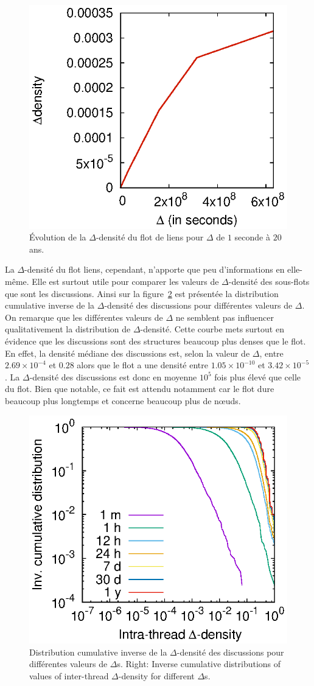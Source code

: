 \begin{figure}
	\centering
	\includegraphics[width=0.48\linewidth]{img/mailing/global_linlin.eps}
	\caption{Évolution de la $\Delta$-densité du flot de liens pour $\Delta$ de $1$ seconde à $20$ ans.}
	\label{fig:dens_fil_discusion}
\end{figure}

La $\Delta$-densité du flot liens, cependant, n'apporte que peu d'informations en elle-même.
Elle est surtout utile pour comparer les valeurs de $\Delta$-densité des sous-flots que sont les discussions.
Ainsi sur la figure~\ref{fig:intra_dens_discussion} est présentée la distribution cumulative inverse de la $\Delta$-densité des discussions pour différentes valeurs de $\Delta$.
On remarque que les différentes valeurs de $\Delta$ ne semblent pas influencer qualitativement la distribution de $\Delta$-densité.
Cette courbe mets surtout en évidence que les discussions sont des structures beaucoup plus denses que le flot.
En effet, la densité médiane des discussions est, selon la valeur de $\Delta$, entre $2.69 \times 10^{-4}$ et $0.28$ alors que le flot a une densité entre $1.05  \times 10^{-10}$ et $3.42 \times 10^{-5}$.
La $\Delta$-densité des discussions est donc en moyenne $10^{5}$ fois plus élevé que celle du flot.
Bien que notable, ce fait est attendu notamment car le flot dure beaucoup plus longtemps et concerne beaucoup plus de n\oe uds.
\begin{figure}
\centering
	\includegraphics[width=0.48\linewidth]{img/mailing/delta.eps}

\caption{Distribution cumulative inverse de la $\Delta$-densité des discussions pour différentes valeurs de $\Delta$s. Right: Inverse cumulative distributions of values of inter-thread $\Delta$-density for different $\Delta$s.}
\label{fig:intra_dens_discussion}
\end{figure}

